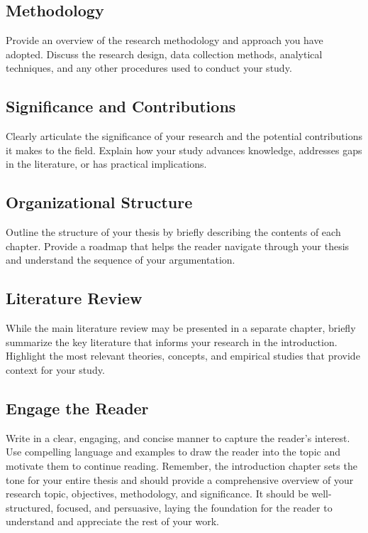 \subsection{Methodology}
Provide an overview of the research methodology and approach you have adopted.
Discuss the research design, data collection methods, analytical techniques, and any other procedures used to conduct your study.

\subsection{Significance and Contributions}
Clearly articulate the significance of your research and the potential contributions it makes to the field.
Explain how your study advances knowledge, addresses gaps in the literature, or has practical implications.

\subsection{Organizational Structure}
Outline the structure of your thesis by briefly describing the contents of each chapter.
Provide a roadmap that helps the reader navigate through your thesis and understand the sequence of your argumentation.

\subsection{Literature Review}
While the main literature review may be presented in a separate chapter, briefly summarize the key literature that informs your research in the introduction.
Highlight the most relevant theories, concepts, and empirical studies that provide context for your study.

\subsection{Engage the Reader}
Write in a clear, engaging, and concise manner to capture the reader's interest.
Use compelling language and examples to draw the reader into the topic and motivate them to continue reading.
Remember, the introduction chapter sets the tone for your entire thesis and should provide a comprehensive overview of your research topic, objectives, methodology, and significance.
It should be well-structured, focused, and persuasive, laying the foundation for the reader to understand and appreciate the rest of your work.

